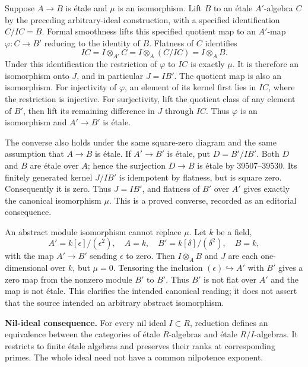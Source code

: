 Suppose \(A\to B\) is étale and \(\mu\) is an isomorphism. Lift \(B\) to an étale \(A'\)-algebra \(C\) by the preceding arbitrary-ideal construction, with a specified identification \(C/IC=B\). Formal smoothness lifts this specified quotient map to an \(A'\)-map \(\varphi:C\to B'\) reducing to the identity of \(B\). Flatness of \(C\) identifies \[
IC=I\otimes_{A'}C=I\otimes_A(C/IC)=I\otimes_A B.
\] Under this identification the restriction of \(\varphi\) to \(IC\) is exactly \(\mu\). It is therefore an isomorphism onto \(J\), and in particular \(J=IB'\). The quotient map is also an isomorphism. For injectivity of \(\varphi\), an element of its kernel first lies in \(IC\), where the restriction is injective. For surjectivity, lift the quotient class of any element of \(B'\), then lift its remaining difference in \(J\) through \(IC\). Thus \(\varphi\) is an isomorphism and \(A'\to B'\) is étale.

The converse also holds under the same square-zero diagram and the same assumption that \(A\to B\) is étale. If \(A'\to B'\) is étale, put \(D=B'/IB'\). Both \(D\) and \(B\) are étale over \(A\); hence the surjection \(D\to B\) is étale by 39507--39530. Its finitely generated kernel \(J/IB'\) is idempotent by flatness, but is square zero. Consequently it is zero. Thus \(J=IB'\), and flatness of \(B'\) over \(A'\) gives exactly the canonical isomorphism \(\mu\). This is a proved converse, recorded as an editorial consequence.

An abstract module isomorphism cannot replace \(\mu\). Let \(k\) be a field, \[
A'=k[\epsilon]/(\epsilon^2),\quad A=k,\quad
B'=k[\delta]/(\delta^2),\quad B=k,
\] with the map \(A'\to B'\) sending \(\epsilon\) to zero. Then \(I\otimes_A B\) and \(J\) are each one-dimensional over \(k\), but \(\mu=0\). Tensoring the inclusion \((\epsilon)\hookrightarrow A'\) with \(B'\) gives a zero map from the nonzero module \(B'\) to \(B'\). Thus \(B'\) is not flat over \(A'\) and the map is not étale. This clarifies the intended canonical reading; it does not assert that the source intended an arbitrary abstract isomorphism.

\textbf{Nil-ideal consequence.} For every nil ideal \(I\subset R\), reduction defines an equivalence between the categories of étale \(R\)-algebras and étale \(R/I\)-algebras. It restricts to finite étale algebras and preserves their ranks at corresponding primes. The whole ideal need not have a common nilpotence exponent.

